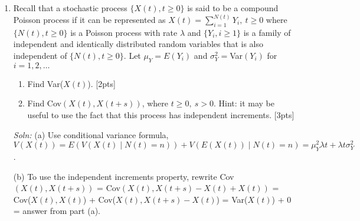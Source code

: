\documentclass[12pt]{article}
\begin{document}
\begin{enumerate}
(b) Let times of completion for the three cars be $X_1,X_2,X_3$. The question is asking what $E(X_1 \mid N(60) = 3)$ is. Now the completion times for these 3 cars is Uniform(0,60) where units are in minutes. Hence $X_1$ is the minimum order statistics of three U($0,60$) random variables. It is easy to derive the cdf of $X_1$ and hence its pdf is $f(x) = \frac{1}{20} (1 - \frac{x}{60})^2,\: x\in (0,60)$  and $E(X_1 \mid N(60) = 3)$ = 15.\\
(c) Condition on whether car A is done by 9:30am or not. Let
completion time for car A be $X_A$. If $X_A < 30$, expected time for
car B to be done is simply 30 minutes.  If $X_A >30$, by
memorylessness of exponential r.v.s, expected additional time for car
A is 30 minutes and time for completion for car B is therefore 30
minutes + 30 minutes (expected value for car B to be done after
mechanic starts working on it.) Hence, expected amount of time car B
spends at the mechanic's shop is:
$$ 30\times P(X_A <30) + (30 +30)\times P(X_A \geq 30) = 30(1-e^{-1}) + 60e^{-1} = 30 + 30e^{-1}. $$

\newpage
\item Recall that a stochastic process $\{X(t),t \geq 0 \}$ is said to be a compound Poisson process if it can be represented as $X(t)=\sum_{i=1}^{N(t)} Y_i,\: t\geq 0$ where $\{N(t),t\geq 0\}$ is a Poisson process with rate $\lambda$ and $\{Y_i,i \geq 1 \}$ is a family of independent and identically distributed random variables that is also independent of $\{N(t),t\geq 0\}$. Let $\mu_Y=E(Y_i)$  and $\sigma_Y^2 = $Var$(Y_i)$ for $i=1,2,\dots$ 
\begin{enumerate}
\item Find Var($X(t)$). [2pts]
\item Find Cov$(X(t), X(t+s))$, where $t \geq 0,\: s >0$. Hint: it may be useful to use the fact that this process has independent increments. [3pts]
\end{enumerate}
{\it Soln:} (a) Use conditional variance formula, $V(X(t)) = E(V(X(t) \mid N(t)=n)) +  V(E(X(t)) \mid N(t)=n) = \mu_Y^2 \lambda t + \lambda t \sigma_Y^2 $.

(b) To use the independent increments property, rewrite Cov$(X(t), X(t+s))$ = Cov$(X(t), X(t+s)-X(t) + X(t))$ = Cov($X(t), X(t)$) + Cov($X(t), X(t+s)-X(t)$)  = Var($X(t)$) + 0 = answer from part (a).

\end{enumerate}
\end{document}
